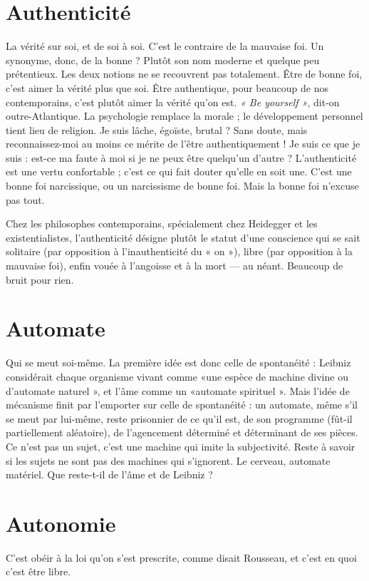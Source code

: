 \section{Authenticité}
La vérité sur soi, et de soi à soi. C’est le contraire de la
mauvaise foi. Un synonyme, donc, de la bonne ? Plutôt
son nom moderne et quelque peu prétentieux. Les deux notions ne se recouvrent
pas totalement. Être de bonne foi, c’est aimer la vérité plus que soi. Être
authentique, pour beaucoup de nos contemporains, c’est plutôt aimer la vérité
qu’on est. {\it « Be yourself »}, dit-on outre-Atlantique. La psychologie remplace la
morale ; le développement personnel tient lieu de religion. Je suis lâche,
égoïste, brutal ? Sans doute, mais reconnaissez-moi au moins ce mérite de l’être
authentiquement ! Je suis ce que je suis : est-ce ma faute à moi si je ne peux être
quelqu'un d’autre ? L’authenticité est une vertu confortable ; c’est ce qui fait
douter qu’elle en soit une. C’est une bonne foi narcissique, ou un narcissisme
de bonne foi. Mais la bonne foi n’excuse pas tout.

Chez les philosophes contemporains, spécialement chez Heidegger et les
existentialistes, l’authenticité désigne plutôt le statut d’une conscience qui se
sait solitaire (par opposition à l’inauthenticité du « on »), libre (par opposition
à la mauvaise foi), enfin vouée à l’angoisse et à la mort — au néant. Beaucoup
de bruit pour rien.

\section{Automate}
Qui se meut soi-même. La première idée est donc celle de spontanéité :
Leibniz considérait chaque organisme vivant comme
«une espèce de machine divine ou d’automate naturel », et l’âme comme un
«automate spirituel ». Mais l’idée de mécanisme finit par l'emporter sur celle
de spontanéité : un automate, même s’il se meut par lui-même, reste prisonnier
de ce qu’il est, de son programme (fût-il partiellement aléatoire), de l’agencement
déterminé et déterminant de ses pièces. Ce n’est pas un sujet, c’est une
machine qui imite la subjectivité. Reste à savoir si les sujets ne sont pas des
machines qui s’ignorent. Le cerveau, automate matériel. Que reste-t-il de l'âme
et de Leibniz ?

\section{Autonomie}
C'est obéir à la loi qu’on s’est prescrite, comme disait Rousseau,
et c’est en quoi c’est être libre.

